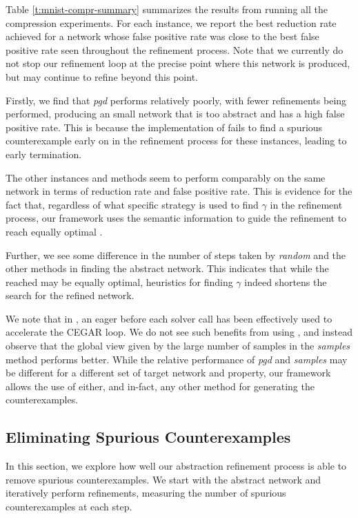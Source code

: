 Table \ref{t:mnist-compr-summary} summarizes the results from running all the
\mnist compression experiments. For each instance, we report the best reduction
rate achieved for a network whose false positive rate was close to the best
false positive rate seen
throughout the refinement process. Note that we currently do not stop our
refinement loop at the precise point where this network is produced, but may
continue to refine beyond this point.

Firstly, we find that \textit{pgd} performs relatively poorly, with fewer
refinements being performed, producing an small network that is too abstract and
has a high false positive rate. This is because the \abcrown
implementation of \pgd fails to find a spurious counterexample early on in the
refinement process for these instances, leading to early termination. 

The other instances and methods seem to perform
comparably on the same network in terms of reduction rate and false positive
rate. This is evidence for the fact that, regardless of what specific strategy
is used to find $\gamma$ in the refinement process, our framework uses the
semantic information to guide the refinement to reach equally optimal \abs.

Further, we see some difference in the number of steps taken by \textit{random}
and the other methods in finding the abstract network. This indicates that while
the \abs reached may be equally optimal, 
heuristics for finding $\gamma$ indeed
shortens the search for the refined network.

We note that in \cite{cleverest-nn}, an eager \pgd before each solver call
has been effectively used to accelerate the CEGAR loop. We do not see such
benefits from using \pgd, and instead observe that the global view given by
the large number of samples in the \textit{samples} method performs better.
While the relative performance of \textit{pgd} and \textit{samples} may be
different for a different set of target network and property, our framework
allows the use of either, and in-fact, any other method for generating the
counterexamples.

\subsection{Eliminating Spurious Counterexamples}
\label{s:exp-mnist-rob}

In this section, we explore how well our abstraction refinement process is able
to remove spurious counterexamples. We start with the abstract network and
iteratively perform refinements, measuring the number of spurious
counterexamples at each step. 

